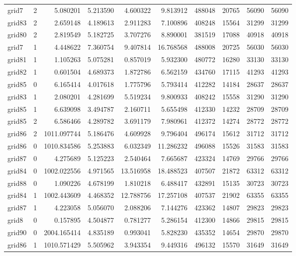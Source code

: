 \begin{longtable}{|l|r|r|r|r|r|r|r|r|r|}
grid7 & 2 & 5.080201 & 5.213590 & 4.600322 & 9.813912 & 488048 & 20765 & 56090 & 56090 \\
grid83 & 2 & 2.659148 & 4.189613 & 2.911283 & 7.100896 & 408248 & 15564 & 31299 & 31299 \\
grid80 & 2 & 2.819549 & 5.182725 & 3.707276 & 8.890001 & 381519 & 17088 & 40918 & 40918 \\
grid7 & 1 & 4.448622 & 7.360754 & 9.407814 & 16.768568 & 488008 & 20725 & 56030 & 56030 \\
grid81 & 1 & 1.105263 & 5.075281 & 0.857019 & 5.932300 & 480772 & 16280 & 33130 & 33130 \\
grid82 & 1 & 0.601504 & 4.689373 & 1.872786 & 6.562159 & 434760 & 17115 & 41293 & 41293 \\
grid85 & 0 & 6.165414 & 4.017618 & 1.775796 & 5.793414 & 412282 & 14184 & 28637 & 28637 \\
grid83 & 1 & 2.080201 & 4.281699 & 5.519234 & 9.800933 & 408242 & 15558 & 31290 & 31290 \\
grid85 & 1 & 6.639098 & 3.494787 & 2.160711 & 5.655498 & 412330 & 14232 & 28709 & 28709 \\
grid85 & 2 & 6.586466 & 4.289782 & 3.691179 & 7.980961 & 412372 & 14274 & 28772 & 28772 \\
grid86 & 2 & 1011.097744 & 5.186476 & 4.609928 & 9.796404 & 496174 & 15612 & 31712 & 31712 \\
grid86 & 0 & 1010.834586 & 5.253883 & 6.032349 & 11.286232 & 496088 & 15526 & 31583 & 31583 \\
grid87 & 0 & 4.275689 & 5.125223 & 2.540464 & 7.665687 & 423324 & 14769 & 29766 & 29766 \\
grid84 & 0 & 1002.022556 & 4.971565 & 13.516958 & 18.488523 & 407507 & 21872 & 63312 & 63312 \\
grid88 & 0 & 1.090226 & 4.678199 & 1.810218 & 6.488417 & 432891 & 15135 & 30723 & 30723 \\
grid84 & 1 & 1002.443609 & 4.468352 & 12.788756 & 17.257108 & 407537 & 21902 & 63355 & 63355 \\
grid87 & 1 & 4.223058 & 5.056070 & 2.088206 & 7.144276 & 423362 & 14807 & 29823 & 29823 \\
grid8 & 0 & 0.157895 & 4.504877 & 0.781277 & 5.286154 & 412300 & 14866 & 29815 & 29815 \\
grid90 & 0 & 2004.165414 & 4.835189 & 0.993041 & 5.828230 & 435352 & 14654 & 29870 & 29870 \\
grid86 & 1 & 1010.571429 & 5.505962 & 3.943354 & 9.449316 & 496132 & 15570 & 31649 & 31649 \\

\end{longtable}
